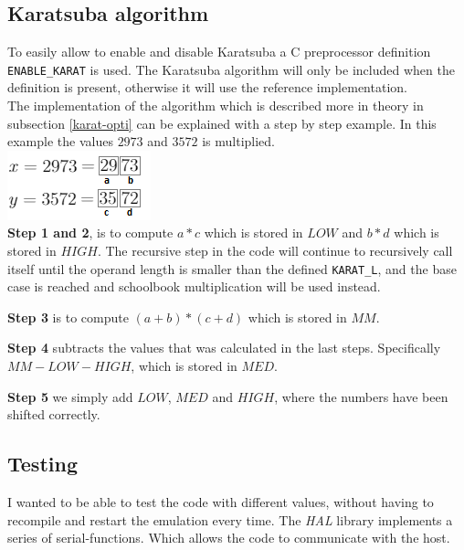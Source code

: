 \subsection{Karatsuba algorithm}
To easily allow to enable and disable Karatsuba a C preprocessor definition \texttt{ENABLE\_KARAT} is used. The Karatsuba algorithm will only be included when the definition is present, otherwise it will use the reference implementation.\medskip
\\
The implementation of the algorithm which is described more in theory in subsection \ref{karat-opti} can be explained with a step by step example. In this example the values $2973$ and $3572$ is multiplied. \\
\includegraphics{report/images/karat-split.png}\\
\textbf{Step 1 and 2}, is to compute $a * c$ which is stored in $LOW$ and $b * d$ which is stored in $HIGH$. The recursive step in the code will continue to recursively call itself until the operand length is smaller than the defined \texttt{KARAT\_L}, and the base case is reached and schoolbook multiplication will be used instead.

\medskip
\textbf{Step 3} is to compute $(a + b) * (c + d)$ which is stored in $MM$.

\medskip
\textbf{Step 4} subtracts the values that was calculated in the last steps. Specifically $MM - LOW - HIGH$, which is stored in $MED$.

\medskip
\textbf{Step 5} we simply add $LOW$, $MED$ and $HIGH$, where the numbers have been shifted correctly.


\subsection{Testing}
\label{sub-testing}
I wanted to be able to test the code with different values, without having to recompile and restart the emulation every time. The \textit{HAL} library implements a series of serial-functions. Which allows the code to communicate with the host.
